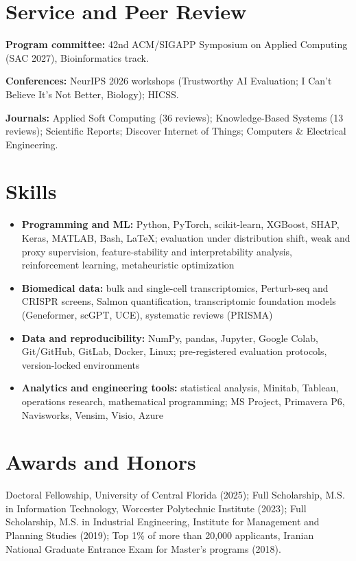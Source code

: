\documentclass[10pt,letterpaper]{article}
\begin{document}
\section{Service and Peer Review}
\begingroup\small
\textbf{Program committee:} 42nd ACM/SIGAPP Symposium on Applied Computing (SAC 2027), Bioinformatics track.\par
\textbf{Conferences:} NeurIPS 2026 workshops (Trustworthy AI Evaluation; I Can't Believe It's Not Better, Biology); HICSS.\par
\textbf{Journals:} Applied Soft Computing (36 reviews); Knowledge-Based Systems (13 reviews); Scientific Reports; Discover Internet of Things; Computers \& Electrical Engineering.
\endgroup

\section{Skills}
\begingroup\small
\begin{itemize}
  \item \textbf{Programming and ML:} Python, PyTorch, scikit-learn, XGBoost, SHAP, Keras, MATLAB, Bash, LaTeX; evaluation under distribution shift, weak and proxy supervision, feature-stability and interpretability analysis, reinforcement learning, metaheuristic optimization
  \item \textbf{Biomedical data:} bulk and single-cell transcriptomics, Perturb-seq and CRISPR screens, Salmon quantification, transcriptomic foundation models (Geneformer, scGPT, UCE), systematic reviews (PRISMA)
  \item \textbf{Data and reproducibility:} NumPy, pandas, Jupyter, Google Colab, Git/GitHub, GitLab, Docker, Linux; pre-registered evaluation protocols, version-locked environments
  \item \textbf{Analytics and engineering tools:} statistical analysis, Minitab, Tableau, operations research, mathematical programming; MS Project, Primavera P6, Navisworks, Vensim, Visio, Azure
\end{itemize}
\endgroup

\section{Awards and Honors}
\begingroup\small
Doctoral Fellowship, University of Central Florida (2025); Full Scholarship, M.S. in Information Technology, Worcester Polytechnic Institute (2023); Full Scholarship, M.S. in Industrial Engineering, Institute for Management and Planning Studies (2019); Top 1\% of more than 20,000 applicants, Iranian National Graduate Entrance Exam for Master's programs (2018).
\endgroup
\end{document}
